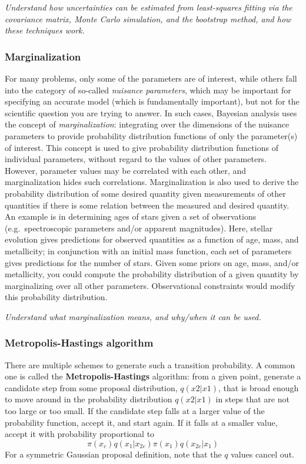 \documentclass{article}
\newcommand{\test}[1]{%
    \begin{center}
        \colorbox{hl}{\parbox{0.9\textwidth}{\emph{\centering #1}}}
    \end{center}}
\begin{document}
\test{Understand how uncertainties can be estimated from least-squares
fitting via the covariance matrix, Monte Carlo simulation, and the
bootstrap method, and how these techniques work.}

\subsubsection{Marginalization} For many problems, only some of the parameters
are of interest, while others fall into the category of so-called
\textit{nuisance parameters}, which may be important for specifying an accurate
model (which is fundamentally important), but not for the scientific question
you are trying to answer. In such cases, Bayesian analysis uses the concept of
\textit{marginalization}: integrating over the dimensions of the nuisance
parameters to provide probability distribution functions of only the
parameter(s) of interest. This concept is used to give probability distribution
functions of individual parameters, without regard to the values of other
parameters. However, parameter values may be correlated with each other, and
marginalization hides such correlations. Marginalization is also used to
derive the probability distribution of some desired quantity given measurements
of other quantities if there is some relation between the measured and desired
quantity. An example is in determining ages of stars given a set of
observations (e.g.\ spectroscopic parameters and/or apparent magnitudes). Here,
stellar evolution gives predictions for observed quantities as a function of
age, mass, and metallicity; in conjunction with an initial mass function, each
set of parameters gives predictions for the number of stars. Given some priors
on age, mass, and/or metallicity, you could compute the probability
distribution of a given quantity by marginalizing over all other parameters.
Observational constraints would modify this probability distribution.

\test{Understand what marginalization means, and why/when it can be used.}


\subsubsection{Metropolis-Hastings algorithm}
There are multiple schemes to generate such a transition probability. A common
one is called the \textbf{Metropolis-Hastings} algorithm: from a given point,
generate a candidate step from some proposal distribution, $q(x2|x1)$, that is
broad enough to move around in the probability distribution $q(x2|x1)$ in steps
that are not too large or too small. If the candidate step falls at a larger
value of the probability function, accept it, and start again. If it falls at a
smaller value, accept it with probability proportional to
\[
    \pi \left( x_{c} \right) q \left( x_{1} | x_{2c} \right)
    \pi \left( x_{1} \right) q \left( x_{2c} | x_{1} \right)
    \]
For a symmetric Gaussian proposal definition, note that the $q$ values
cancel out.
\end{document}
